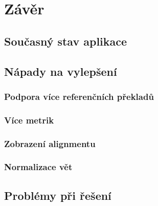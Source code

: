 \chapter{Závěr}

\section{Současný stav aplikace}

\section{Nápady na vylepšení}
\subsection{Podpora více referenčních překladů}

\subsection{Více metrik}

\subsection{Zobrazení alignmentu}

\subsection{Normalizace vět}

\section{Problémy při řešení}
